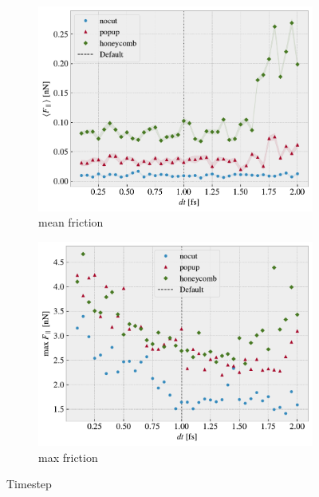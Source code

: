 



\begin{figure}[H]
  \centering
  \begin{subfigure}[b]{0.49\textwidth}
      \centering
      \includegraphics[width=\textwidth]{figures/baseline/variables_dt_mean_fixmove.pdf}
      \caption{mean friction}
      \label{fig:var_dt_mean}
  \end{subfigure}
  \hfill
  \begin{subfigure}[b]{0.49\textwidth}
      \centering
      \includegraphics[width=\textwidth]{figures/baseline/variables_dt_max_fixmove.pdf}
      \caption{max friction}
      \label{fig:var_dt_max}
  \end{subfigure}
  \hfill
     \caption{Timestep}
     \label{fig:var_dt}
\end{figure}






